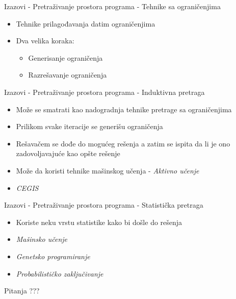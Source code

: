 \documentclass{beamer}
\begin{document}
\begin{frame}{Izazovi - Pretraživanje prostora programa - Tehnike sa ograničenjima}
    \begin{itemize}
        \item Tehnike prilagođavanja datim ograničenjima
        \item Dva velika koraka:
            \begin{itemize}
                \item Generisanje ograničenja
                \item Razrešavanje ograničenja
            \end{itemize}
    \end{itemize}
\end{frame}

\begin{frame}{Izazovi - Pretraživanje prostora programa - Induktivna pretraga}
    \begin{itemize}
        \item Može se smatrati kao nadogradnja tehnike pretrage sa ograničenjima
        \item Prilikom svake iteracije se generišu ograničenja
        \item Rešavačem se dođe do mogućeg rešenja a zatim se ispita da li je ono zadovoljavajuće kao opšte rešenje
        \item Može da koristi tehnike mašinskog učenja - \emph{Aktivno učenje}
        \item \emph{CEGIS}
    \end{itemize}
\end{frame}

\begin{frame}{Izazovi - Pretraživanje prostora programa - Statistička pretraga}
    \begin{itemize}
        \item Koriste neku vrstu statistike kako bi došle do rešenja
        \item \emph{Mašinsko učenje}
        \item \emph{Genetsko programiranje}
        \item \emph{Probabilističko zaključivanje}
    \end{itemize}
\end{frame}



\begin{frame}{Pitanja}
    \centering
    ???
\end{frame}
\end{document}
